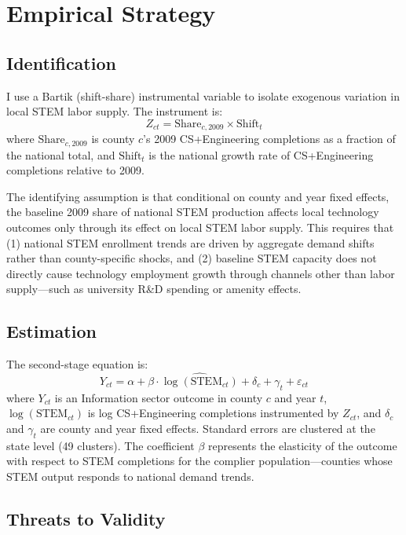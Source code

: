 \documentclass[12pt]{article}
\begin{document}
\section{Empirical Strategy}

\subsection{Identification}

I use a Bartik (shift-share) instrumental variable to isolate exogenous variation in local STEM labor supply. The instrument is:
\begin{equation}
Z_{ct} = \text{Share}_{c,2009} \times \text{Shift}_t
\end{equation}
where $\text{Share}_{c,2009}$ is county $c$'s 2009 CS+Engineering completions as a fraction of the national total, and $\text{Shift}_t$ is the national growth rate of CS+Engineering completions relative to 2009.

The identifying assumption is that conditional on county and year fixed effects, the baseline 2009 share of national STEM production affects local technology outcomes only through its effect on local STEM labor supply. This requires that (1) national STEM enrollment trends are driven by aggregate demand shifts rather than county-specific shocks, and (2) baseline STEM capacity does not directly cause technology employment growth through channels other than labor supply---such as university R\&D spending or amenity effects.

\subsection{Estimation}

The second-stage equation is:
\begin{equation}
Y_{ct} = \alpha + \beta \cdot \widehat{\log(\text{STEM}_{ct})} + \delta_c + \gamma_t + \varepsilon_{ct}
\end{equation}
where $Y_{ct}$ is an Information sector outcome in county $c$ and year $t$, $\log(\text{STEM}_{ct})$ is log CS+Engineering completions instrumented by $Z_{ct}$, and $\delta_c$ and $\gamma_t$ are county and year fixed effects. Standard errors are clustered at the state level (49 clusters). The coefficient $\beta$ represents the elasticity of the outcome with respect to STEM completions for the complier population---counties whose STEM output responds to national demand trends.

\subsection{Threats to Validity}
\end{document}
